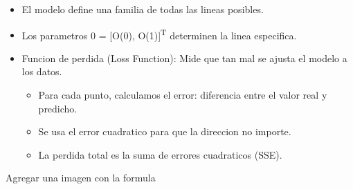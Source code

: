 \documentclass[11pt]{article}
\begin{document}
\begin{enumerate}
\begin{itemize}
\item El modelo define una familia de todas las lineas posibles.
\item Los parametros 0 = [O(0), O(1)]\textsuperscript{T} determinen la linea especifica.
\item Funcion de perdida (Loss Function): Mide que tan mal se ajusta el modelo a los datos.
\begin{itemize}
\item Para cada punto, calculamos el error: diferencia entre el valor real y predicho.
\item Se usa el error cuadratico para que la direccion no importe.
\item La perdida total es la suma de errores cuadraticos (SSE).
\end{itemize}
\end{itemize}
Agregar una imagen con la formula
\end{enumerate}
\end{document}
